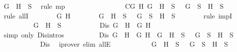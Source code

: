 \begin{isabellebody}
\ {\isacartoucheopen}G\ \isactrlbold {\isasymor}\ H\ {\isasymin}\ S{\isacartoucheclose}\ \isamarkupfalse%
\ {\isacharparenleft}rule\ mp{\isacharparenright}\isanewline
\ \ \ \ \ \ \isamarkupfalse%
\isanewline
\ \ \ \ \isamarkupfalse%
\isanewline
\ \ \ \ \isamarkupfalse%
\ C{}{\isacharcolon}{\isachardoublequoteopen}{\isasymforall}G\ H{\isachardot}\ G\ \isactrlbold {\isasymrightarrow}\ H\ {\isasymin}\ S\ {\isasymlongrightarrow}\ \isactrlbold {\isasymnot}\ G\ {\isasymin}\ S\ {\isasymor}\ H\ {\isasymin}\ S{\isachardoublequoteclose}\isanewline
\ \ \ \ \isamarkupfalse%
\ {\isacharparenleft}rule\ allI{\isacharparenright}{\isacharplus}\isanewline
\ \ \ \ \ \ \isamarkupfalse%
\ G\ H\isanewline
\ \ \ \ \ \ \isamarkupfalse%
\ {\isachardoublequoteopen}G\ \isactrlbold {\isasymrightarrow}\ H\ {\isasymin}\ S\ {\isasymlongrightarrow}\ \isactrlbold {\isasymnot}\ G\ {\isasymin}\ S\ {\isasymor}\ H\ {\isasymin}\ S{\isachardoublequoteclose}\isanewline
\ \ \ \ \ \ \isamarkupfalse%
\ {\isacharparenleft}rule\ impI{\isacharparenright}\isanewline
\ \ \ \ \ \ \ \ \isamarkupfalse%
\ {\isachardoublequoteopen}G\ \isactrlbold {\isasymrightarrow}\ H\ {\isasymin}\ S{\isachardoublequoteclose}\ \isanewline
\ \ \ \ \ \ \ \ \isamarkupfalse%
\ {\isachardoublequoteopen}Dis\ {\isacharparenleft}G\ \isactrlbold {\isasymrightarrow}\ H{\isacharparenright}\ {\isacharparenleft}\isactrlbold {\isasymnot}\ G{\isacharparenright}\ H{\isachardoublequoteclose}\isanewline
\ \ \ \ \ \ \ \ \ \ \isamarkupfalse%
\ {\isacharparenleft}simp\ only{\isacharcolon}\ Dis{\isachardot}intros{\isacharparenleft}{}{\isacharparenright}{\isacharparenright}\isanewline
\ \ \ \ \ \ \ \ \isamarkupfalse%
\ {\isachardoublequoteopen}Dis\ {\isacharparenleft}G\ \isactrlbold {\isasymrightarrow}\ H{\isacharparenright}\ {\isacharparenleft}\isactrlbold {\isasymnot}\ G{\isacharparenright}\ H\ {\isasymlongrightarrow}\ G\ \isactrlbold {\isasymrightarrow}\ H\ {\isasymin}\ S\ {\isasymlongrightarrow}\ \isactrlbold {\isasymnot}\ G\ {\isasymin}\ S\ {\isasymor}\ H\ {\isasymin}\ S{\isachardoublequoteclose}\isanewline
\ \ \ \ \ \ \ \ \ \ \isamarkupfalse%
\ Dis\ \isamarkupfalse%
\ {\isacharparenleft}iprover\ elim{\isacharcolon}\ allE{\isacharparenright}\isanewline
\ \ \ \ \ \ \ \ \isamarkupfalse%
\ \isamarkupfalse%
\ {\isachardoublequoteopen}G\ \isactrlbold {\isasymrightarrow}\ H\ {\isasymin}\ S\ {\isasymlongrightarrow}\ \isactrlbold {\isasymnot}\ G\ {\isasymin}\ S\ {\isasymor}\ H\ {\isasymin}\ S{\isachardoublequoteclose}\ \isanewline

\end{isabellebody}
